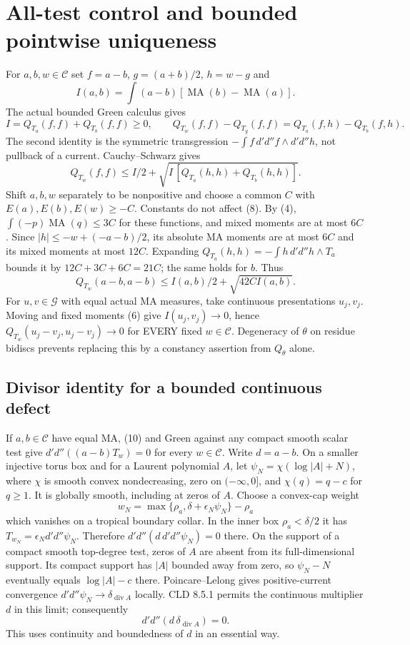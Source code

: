\documentclass[11pt]{article}
\newcommand{\C}{\mathcal C}
\newcommand{\G}{\mathcal G}
\newcommand{\MA}{\operatorname{MA}}
\begin{document}
\section{All-test control and bounded pointwise uniqueness}
For $a,b,w\in\C$ set $f=a-b$, $g=(a+b)/2$, $h=w-g$ and
\[
 I(a,b)=\int(a-b)[\MA(b)-\MA(a)].
\]
The actual bounded Green calculus gives
\[
 I=Q_{T_a}(f,f)+Q_{T_b}(f,f)\ge0,
\qquad
 Q_{T_w}(f,f)-Q_{T_g}(f,f)
   =Q_{T_a}(f,h)-Q_{T_b}(f,h).                              \tag{8}
\]
The second identity is the symmetric transgression
$-\int f\,d'd''f\wedge d'd''h$, not pullback of a current.
Cauchy--Schwarz gives
\[
 Q_{T_w}(f,f)\le I/2+
 \sqrt{I\,[Q_{T_a}(h,h)+Q_{T_b}(h,h)]}.                     \tag{9}
\]
Shift $a,b,w$ separately to be nonpositive and choose a common $C$ with
$E(a),E(b),E(w)\ge-C$. Constants do not affect (8).
By (4), $\int(-p)\MA(q)\le3C$ for these functions, and mixed moments are
at most $6C$. Since $|h|\le-w+(-a-b)/2$, its absolute MA moments are
at most $6C$ and its mixed moments at most $12C$.
Expanding $Q_{T_a}(h,h)=-\int h\,d'd''h\wedge T_a$ bounds it by
$12C+3C+6C=21C$; the same holds for $b$. Thus
\[
 Q_{T_w}(a-b,a-b)\le I(a,b)/2+\sqrt{42C I(a,b)}.             \tag{10}
\]
For $u,v\in\G$ with equal actual MA measures, take continuous presentations
$u_j,v_j$. Moving and fixed moments (6) give $I(u_j,v_j)\to0$, hence
$Q_{T_w}(u_j-v_j,u_j-v_j)\to0$ for EVERY fixed $w\in\C$.
Degeneracy of $\theta$ on residue bidiscs prevents replacing this by a
constancy assertion from $Q_\theta$ alone.

\subsection{Divisor identity for a bounded continuous defect}
If $a,b\in\C$ have equal MA, (10) and Green against any compact smooth
scalar test give $d'd''((a-b)T_w)=0$ for every $w\in\C$.
Write $d=a-b$. On a smaller injective torus box and for a Laurent polynomial
$A$, let $\psi_N=\chi(\log|A|+N)$, where $\chi$ is smooth convex
nondecreasing, zero on $(-\infty,0]$, and $\chi(q)=q-c$ for $q\ge1$.
It is globally smooth, including at zeros of $A$.
Choose a convex-cap weight
\[
 w_N=\max\{\rho_a,\delta+\epsilon_N\psi_N\}-\rho_a
\]
which vanishes on a tropical boundary collar. In the inner box
$\rho_a<\delta/2$ it has $T_{w_N}=\epsilon_Nd'd''\psi_N$.
Therefore $d'd''(d\,d'd''\psi_N)=0$ there.
On the support of a compact smooth top-degree test, zeros of $A$ are absent
from its full-dimensional support. Its compact support has $|A|$ bounded
away from zero, so $\psi_N-N$ eventually equals $\log|A|-c$ there.
Poincare--Lelong gives positive-current convergence
$d'd''\psi_N\to\delta_{\operatorname{div}A}$ locally.
CLD 8.5.1 permits the continuous multiplier $d$ in this limit; consequently
\[
 d'd''(d\,\delta_{\operatorname{div}A})=0.                  \tag{11}
\]
This uses continuity and boundedness of $d$ in an essential way.
\end{document}

